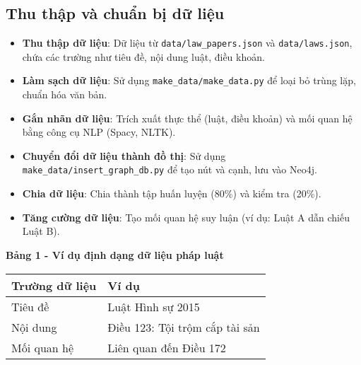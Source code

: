 \documentclass[a4paper,12pt]{article}
\begin{document}
\subsection{Thu thập và chuẩn bị dữ liệu}
\begin{itemize}
    \item \textbf{Thu thập dữ liệu}: Dữ liệu từ \texttt{data/law\_papers.json} và \texttt{data/laws.json}, chứa các trường như tiêu đề, nội dung luật, điều khoản.
    \item \textbf{Làm sạch dữ liệu}: Sử dụng \texttt{make\_data/make\_data.py} để loại bỏ trùng lặp, chuẩn hóa văn bản.
    \item \textbf{Gắn nhãn dữ liệu}: Trích xuất thực thể (luật, điều khoản) và mối quan hệ bằng công cụ NLP (Spacy, NLTK).
    \item \textbf{Chuyển đổi dữ liệu thành đồ thị}: Sử dụng \texttt{make\_data/insert\_graph\_db.py} để tạo nút và cạnh, lưu vào Neo4j.
    \item \textbf{Chia dữ liệu}: Chia thành tập huấn luyện (80\%) và kiểm tra (20\%).
    \item \textbf{Tăng cường dữ liệu}: Tạo mối quan hệ suy luận (ví dụ: Luật A dẫn chiếu Luật B).
\end{itemize}

\textbf{Bảng 1 - Ví dụ định dạng dữ liệu pháp luật}
\begin{table}[h!]
\centering
\begin{tabular}{|p{5cm}|p{5cm}|}
\hline
\textbf{Trường dữ liệu} & \textbf{Ví dụ} \\ \hline
Tiêu đề & Luật Hình sự 2015 \\ \hline
Nội dung & Điều 123: Tội trộm cắp tài sản \\ \hline
Mối quan hệ & Liên quan đến Điều 172 \\ \hline
\end{tabular}
\end{table}
\end{document}
